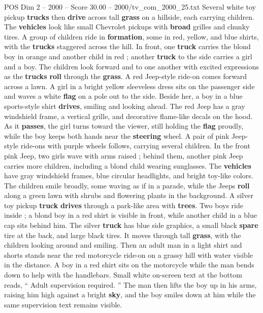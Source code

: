 \begin{textsample}{POS Dim 2 – 2000 – Score 30.00 – 2000/tv\_com\_2000\_25.txt}
Several white toy pickup \textbf{trucks} then \textbf{drive} across tall \textbf{grass} on a hillside, each carrying children.
The \textbf{vehicles} look like small Chevrolet pickups with \textbf{broad} grilles and chunky tires.
A group of children ride in \textbf{formation}, some in red, yellow, and blue shirts, with the \textbf{trucks} staggered across the hill.
In front, one \textbf{truck} carries the blond boy in orange and another child in red ; another \textbf{truck} to the side carries a girl and a boy.
The children look forward and to one another with excited expressions as the \textbf{trucks} \textbf{roll} through the \textbf{grass}.
A red Jeep-style ride-on comes forward across a lawn.
A girl in a bright yellow sleeveless dress sits on the passenger side and waves a white \textbf{flag} on a pole out to the side.
Beside her, a boy in a blue sports-style shirt \textbf{drives}, smiling and looking ahead.
The red Jeep has a gray windshield frame, a vertical grille, and decorative flame-like decals on the hood.
As it \textbf{passes}, the girl turns toward the viewer, still holding the \textbf{flag} proudly, while the boy keeps both hands near the \textbf{steering} wheel.
A pair of pink Jeep-style ride-ons with purple wheels follows, carrying several children.
In the front pink Jeep, two girls wave with arms raised ; behind them, another pink Jeep carries more children, including a blond child wearing sunglasses.
The \textbf{vehicles} have gray windshield frames, blue circular headlights, and bright toy-like colors.
The children smile broadly, some waving as if in a parade, while the Jeeps \textbf{roll} along a green lawn with shrubs and flowering plants in the background.
A silver toy pickup \textbf{truck} \textbf{drives} through a park-like area with \textbf{trees}.
Two boys ride inside ; a blond boy in a red shirt is visible in front, while another child in a blue cap sits behind him.
The silver \textbf{truck} has blue side graphics, a small black \textbf{spare} tire at the back, and large black tires.
It moves through tall \textbf{grass}, with the children looking around and smiling.
Then an adult man in a light shirt and shorts stands near the red motorcycle ride-on on a grassy hill with water visible in the distance.
A boy in a red shirt sits on the motorcycle while the man bends down to help with the handlebars.
Small white on-screen text at the bottom reads, “ Adult supervision required. ” The man then lifts the boy up in his arms, raising him high against a bright \textbf{sky}, and the boy smiles down at him while the same supervision text remains visible.

\end{textsample}
